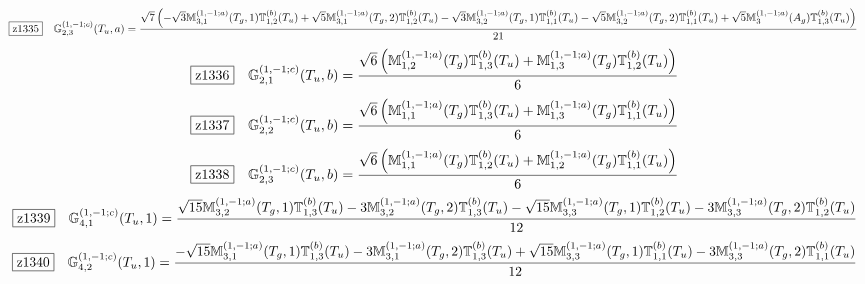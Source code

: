 \documentclass[fleqn,10pt,landscape]{jsarticle}
\begin{document}
\begin{dmath*}
\hspace*{3mm}\fbox{z1335}\quad \mathbb{G}_{2,3}^{(1,-1;c)}(T_{u},a)=\frac{\sqrt{7} \left(- \sqrt{3} \mathbb{M}_{3,1}^{(1,-1;a)}(T_{g},1) \mathbb{T}_{1,2}^{(b)}(T_{u}) + \sqrt{5} \mathbb{M}_{3,1}^{(1,-1;a)}(T_{g},2) \mathbb{T}_{1,2}^{(b)}(T_{u}) - \sqrt{3} \mathbb{M}_{3,2}^{(1,-1;a)}(T_{g},1) \mathbb{T}_{1,1}^{(b)}(T_{u}) - \sqrt{5} \mathbb{M}_{3,2}^{(1,-1;a)}(T_{g},2) \mathbb{T}_{1,1}^{(b)}(T_{u}) + \sqrt{5} \mathbb{M}_{3}^{(1,-1;a)}(A_{g}) \mathbb{T}_{1,3}^{(b)}(T_{u})\right)}{21}
\end{dmath*}
\begin{dmath*}
\hspace*{3mm}\fbox{z1336}\quad \mathbb{G}_{2,1}^{(1,-1;c)}(T_{u},b)=\frac{\sqrt{6} \left(\mathbb{M}_{1,2}^{(1,-1;a)}(T_{g}) \mathbb{T}_{1,3}^{(b)}(T_{u}) + \mathbb{M}_{1,3}^{(1,-1;a)}(T_{g}) \mathbb{T}_{1,2}^{(b)}(T_{u})\right)}{6}
\end{dmath*}
\begin{dmath*}
\hspace*{3mm}\fbox{z1337}\quad \mathbb{G}_{2,2}^{(1,-1;c)}(T_{u},b)=\frac{\sqrt{6} \left(\mathbb{M}_{1,1}^{(1,-1;a)}(T_{g}) \mathbb{T}_{1,3}^{(b)}(T_{u}) + \mathbb{M}_{1,3}^{(1,-1;a)}(T_{g}) \mathbb{T}_{1,1}^{(b)}(T_{u})\right)}{6}
\end{dmath*}
\begin{dmath*}
\hspace*{3mm}\fbox{z1338}\quad \mathbb{G}_{2,3}^{(1,-1;c)}(T_{u},b)=\frac{\sqrt{6} \left(\mathbb{M}_{1,1}^{(1,-1;a)}(T_{g}) \mathbb{T}_{1,2}^{(b)}(T_{u}) + \mathbb{M}_{1,2}^{(1,-1;a)}(T_{g}) \mathbb{T}_{1,1}^{(b)}(T_{u})\right)}{6}
\end{dmath*}
\begin{dmath*}
\hspace*{3mm}\fbox{z1339}\quad \mathbb{G}_{4,1}^{(1,-1;c)}(T_{u},1)=\frac{\sqrt{15} \mathbb{M}_{3,2}^{(1,-1;a)}(T_{g},1) \mathbb{T}_{1,3}^{(b)}(T_{u}) - 3 \mathbb{M}_{3,2}^{(1,-1;a)}(T_{g},2) \mathbb{T}_{1,3}^{(b)}(T_{u}) - \sqrt{15} \mathbb{M}_{3,3}^{(1,-1;a)}(T_{g},1) \mathbb{T}_{1,2}^{(b)}(T_{u}) - 3 \mathbb{M}_{3,3}^{(1,-1;a)}(T_{g},2) \mathbb{T}_{1,2}^{(b)}(T_{u})}{12}
\end{dmath*}
\begin{dmath*}
\hspace*{3mm}\fbox{z1340}\quad \mathbb{G}_{4,2}^{(1,-1;c)}(T_{u},1)=\frac{- \sqrt{15} \mathbb{M}_{3,1}^{(1,-1;a)}(T_{g},1) \mathbb{T}_{1,3}^{(b)}(T_{u}) - 3 \mathbb{M}_{3,1}^{(1,-1;a)}(T_{g},2) \mathbb{T}_{1,3}^{(b)}(T_{u}) + \sqrt{15} \mathbb{M}_{3,3}^{(1,-1;a)}(T_{g},1) \mathbb{T}_{1,1}^{(b)}(T_{u}) - 3 \mathbb{M}_{3,3}^{(1,-1;a)}(T_{g},2) \mathbb{T}_{1,1}^{(b)}(T_{u})}{12}
\end{dmath*}
\end{document}
